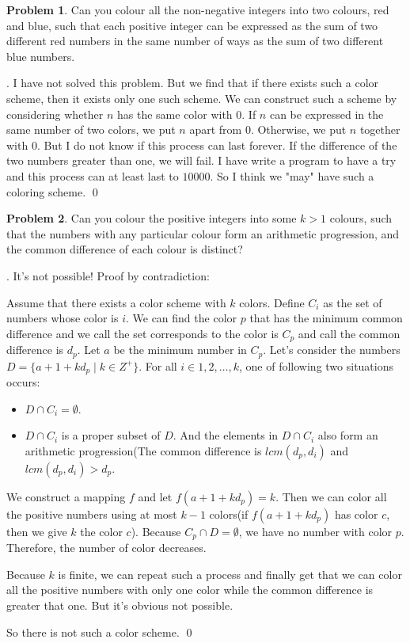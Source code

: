 \documentclass[12pt]{article}
\theoremstyle{definition}
\newtheorem{hw}{Problem}
\newenvironment{sol}
  {\par\vspace{3mm}\noindent{\it Solution}.}
  {\qed}
\begin{document}
\begin{hw} Can you colour all the non-negative integers into two
  colours, red and blue, such that each positive integer can be
  expressed as the sum of two different red
numbers in the same number of ways as the sum of two different blue numbers.
\end{hw}

\begin{sol}
	I have not solved this problem. But we find that if there exists such a color scheme, then it exists only one such scheme. We can construct such a scheme by considering whether $n$ has the same color with $0$. If $n$ can be expressed in the same number of two colors, we put $n$ apart from $0$. Otherwise, we put $n$ together with $0$. But I do not know if this process can last forever. If the difference of the two numbers greater than one, we will fail. I have write a program to have a try and this process can at least last to $10000$. So I think we "may" have such a coloring scheme.
\end{sol}

\begin{hw}
Can you colour the positive integers into some $k>1$ colours, such
that the numbers with any particular colour form an arithmetic
progression,
and the common difference of each colour is distinct?
\end{hw}

\begin{sol}
	It's not possible! Proof by contradiction:
	
	Assume that there exists a color scheme with $k$ colors. Define $C_i$ as the set of numbers whose color is $i$. We can find the color $p$ that has the minimum common difference and we call the set corresponds to the color is $C_p$ and call the common difference is $d_p$. Let $a$ be the minimum number in $C_p$. Let's consider the numbers $D = \{ a+1 + kd_p \mid k \in Z^+ \} $.  For all $i \in {1, 2, \dots, k}$, one of following two situations occurs:
	\begin{itemize}
		\item $D \cap C_i = \emptyset$.
		\item $D \cap C_i$ is a proper subset of $D$. And the elements in $D \cap C_i$ also form an arithmetic progression(The common difference is $lcm(d_p,d_i)$ and $lcm(d_p,d_i) > d_p$. 
	\end{itemize}
	We construct a mapping $f$ and let $f(a+1+kd_p) = k$. Then we can color all the positive numbers using at most $k-1$ colors(if $f(a+1+kd_p)$ has color $c$, then we give $k$ the color $c$). Because $C_p \cap D = \emptyset$, we have no number with color $p$. Therefore, the number of color decreases.
	
	Because $k$ is finite, we can repeat such a process and finally get that we can color all the positive numbers with only one color while the common difference is greater that one. But it's obvious not possible. 
	
	So there is not such a color scheme.
\end{sol}
\end{document}
